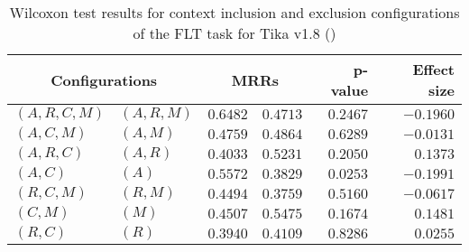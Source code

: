 
\begin{table}
\begin{spacing}{1.2}
\centering
\caption{Wilcoxon test results for context inclusion and exclusion configurations of the FLT task for Tika v1.8 (\ctwo)}
\label{table:versus-wilcox-tika-flt-context}
\begin{tabular}{ll|rr|rr}
\toprule
      \multicolumn{2}{c|}{Configurations} &                \multicolumn{2}{c|}{MRRs} &             p-value & Effect size \\
\midrule
 $(A,R,C,M)$ &  $(A,R,M)$ &  $\bm{0.6482}$ &       $0.4713$ & $0.2467$ &   $-0.1960$ \\
   $(A,C,M)$ &    $(A,M)$ &       $0.4759$ &  $\bm{0.4864}$ & $0.6289$ &   $-0.0131$ \\
   $(A,R,C)$ &    $(A,R)$ &       $0.4033$ &  $\bm{0.5231}$ & $0.2050$ &    $0.1373$ \\
     $(A,C)$ &      $(A)$ &  $\bm{0.5572}$ &       $0.3829$ & $0.0253$ &   $-0.1991$ \\
   $(R,C,M)$ &    $(R,M)$ &  $\bm{0.4494}$ &       $0.3759$ & $0.5160$ &   $-0.0617$ \\
     $(C,M)$ &      $(M)$ &       $0.4507$ &  $\bm{0.5475}$ & $0.1674$ &    $0.1481$ \\
     $(R,C)$ &      $(R)$ &       $0.3940$ &  $\bm{0.4109}$ & $0.8286$ &    $0.0255$ \\
\bottomrule
\end{tabular}

\end{spacing}
\end{table}

